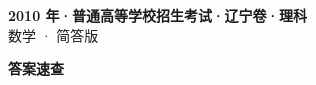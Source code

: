\documentclass[zihao=-4, a4paper]{ctexart}
\begin{document}
\begin{center}
  {\Large\bfseries 2010 年·普通高等学校招生考试·辽宁卷·理科}\\[4pt]
  {\large 数学 · 简答版}
\end{center}
\medskip
{}

\clearpage
{}
\begin{center}{\Large\bfseries 答案速查}\end{center}
\medskip

\end{document}
